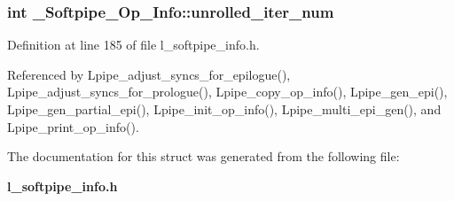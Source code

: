 \subsubsection{\setlength{\rightskip}{0pt plus 5cm}int \bf{\_\-Softpipe\_\-Op\_\-Info::unrolled\_\-iter\_\-num}}\label{struct__Softpipe__Op__Info_3a8f182441fa610e021d5140f0e65625}




Definition at line 185 of file l\_\-softpipe\_\-info.h.

Referenced by Lpipe\_\-adjust\_\-syncs\_\-for\_\-epilogue(), Lpipe\_\-adjust\_\-syncs\_\-for\_\-prologue(), Lpipe\_\-copy\_\-op\_\-info(), Lpipe\_\-gen\_\-epi(), Lpipe\_\-gen\_\-partial\_\-epi(), Lpipe\_\-init\_\-op\_\-info(), Lpipe\_\-multi\_\-epi\_\-gen(), and Lpipe\_\-print\_\-op\_\-info().

The documentation for this struct was generated from the following file:\begin{CompactItemize}
\item 
\bf{l\_\-softpipe\_\-info.h}\end{CompactItemize}
